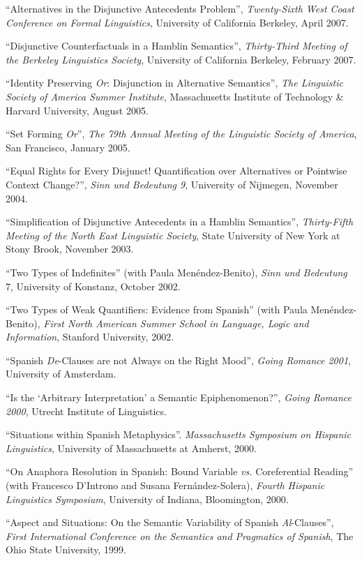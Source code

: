 \documentclass[11pt]{article}
\begin{document}
``Alternatives in the Disjunctive Antecedents Problem'', \textit{Twenty-Sixth West Coast Conference on Formal Linguistics}, University of California Berkeley, April 2007.


``Disjunctive Counterfactuals in a Hamblin Semantics'', \textit{Thirty-Third Meeting of the Berkeley Linguistics Society}, University of California Berkeley, February 2007. 

``Identity Preserving \textit{Or}: Disjunction in Alternative Semantics'', \textit{The Linguistic Society of America Summer Institute}, Massachusetts Institute of Technology \& Harvard University, August 2005. 

``Set Forming \textit{Or}'', \textit{The 79th Annual Meeting of the Linguistic Society of America}, San Francisco, January 2005. 

``Equal Rights for Every Disjunct! Quantification over Alternatives or Pointwise Context Change?'', \textit{Sinn und Bedeutung 9}, University of Nijmegen, November 2004. 

``Simplification of Disjunctive Antecedents in a Hamblin Semantics'', \textit{Thirty-Fifth
  Meeting of the North East Linguistic Society}, State University of New York at Stony Brook, November 2003. 

``Two Types of Indefinites'' (with Paula Men\'endez-Benito), \textit{Sinn und Bedeutung} 7, University of Konstanz, October 2002. 

``Two Types of Weak Quantifiers: Evidence from Spanish'' (with Paula Men\'endez-Benito), \textit{First North American Summer School in Language, Logic and Information}, Stanford University, 2002. 

``Spanish \textit{De}-Clauses are not Always on the Right Mood'', \textit{Going Romance 2001}, University of Amsterdam. 

``Is the `Arbitrary Interpretation' a Semantic Epiphenomenon?'', \textit{Going Romance 2000}, Utrecht Institute of Linguistics.

``Situations within Spanish Metaphysics''. \textit{Massachusetts Symposium on Hispanic Linguistics}, University of Massachusetts at Amherst, 2000. 

``On Anaphora Resolution in Spanish: Bound Variable \textit{vs.} Coreferential Reading'' (with Francesco D'Introno and Susana Fern\'andez-Solera), \textit{Fourth Hispanic Linguistics Symposium}, University of Indiana, Bloomington, 2000. 

``Aspect and Situations: On the Semantic Variability of Spanish \textit{Al}-Clauses'', \textit{First International Conference on the Semantics and Pragmatics of Spanish}, The Ohio State University, 1999. 
\end{document}
